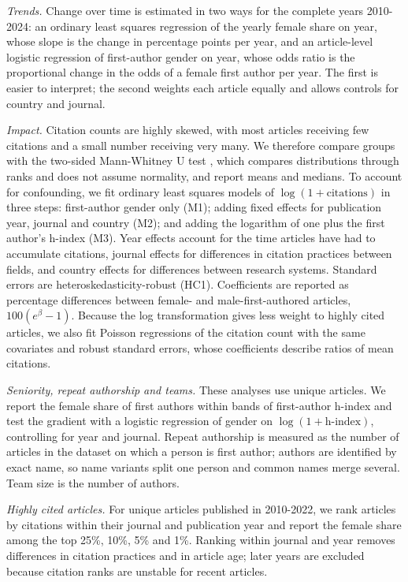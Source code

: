 \documentclass[preprint,12pt,number]{elsarticle}
\begin{document}
\textit{Trends.} Change over time is estimated in two ways for the complete years 2010-2024: an ordinary least squares regression of the yearly female share on year, whose slope is the change in percentage points per year, and an article-level logistic regression of first-author gender on year, whose odds ratio is the proportional change in the odds of a female first author per year. The first is easier to interpret; the second weights each article equally and allows controls for country and journal.

\textit{Impact.} Citation counts are highly skewed, with most articles receiving few citations and a small number receiving very many. We therefore compare groups with the two-sided Mann-Whitney U test \citep{MannWhitney1947}, which compares distributions through ranks and does not assume normality, and report means and medians. To account for confounding, we fit ordinary least squares models of $\log(1+\text{citations})$ in three steps: first-author gender only (M1); adding fixed effects for publication year, journal and country (M2); and adding the logarithm of one plus the first author's h-index (M3). Year effects account for the time articles have had to accumulate citations, journal effects for differences in citation practices between fields, and country effects for differences between research systems. Standard errors are heteroskedasticity-robust (HC1). Coefficients are reported as percentage differences between female- and male-first-authored articles, $100(e^{\beta}-1)$. Because the log transformation gives less weight to highly cited articles, we also fit Poisson regressions of the citation count with the same covariates and robust standard errors, whose coefficients describe ratios of mean citations.

\textit{Seniority, repeat authorship and teams.} These analyses use unique articles. We report the female share of first authors within bands of first-author h-index and test the gradient with a logistic regression of gender on $\log(1+\text{h-index})$, controlling for year and journal. Repeat authorship is measured as the number of articles in the dataset on which a person is first author; authors are identified by exact name, so name variants split one person and common names merge several. Team size is the number of authors.

\textit{Highly cited articles.} For unique articles published in 2010-2022, we rank articles by citations within their journal and publication year and report the female share among the top 25\%, 10\%, 5\% and 1\%. Ranking within journal and year removes differences in citation practices and in article age; later years are excluded because citation ranks are unstable for recent articles.
\end{document}
